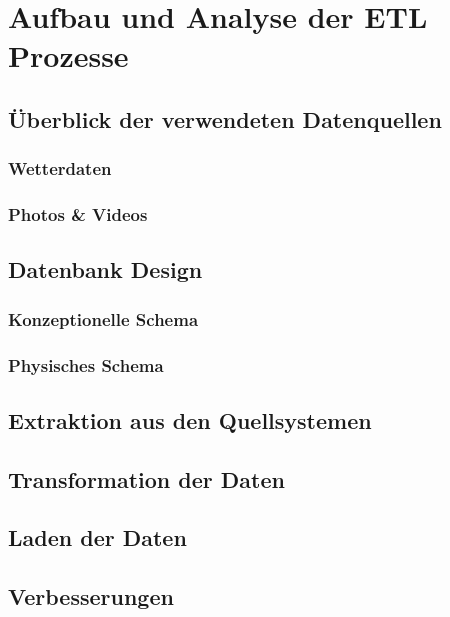 
\chapter{Aufbau und Analyse der ETL Prozesse}
\section{Überblick der verwendeten Datenquellen}
\subsection{Wetterdaten}
\subsection{Photos \& Videos}
\section{Datenbank Design}
\subsection{Konzeptionelle Schema}
\subsection{Physisches Schema}
\section{Extraktion aus den Quellsystemen}
\section{Transformation der Daten}
\section{Laden der Daten}
\section{Verbesserungen}

